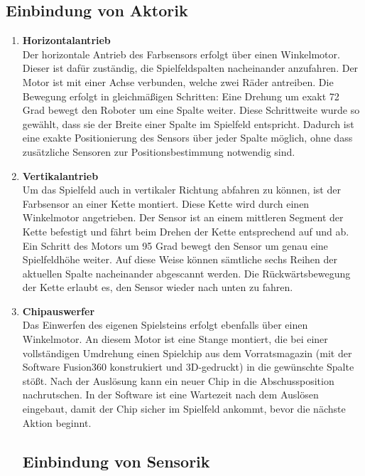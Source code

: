\subsection{Einbindung von Aktorik}
\begin{enumerate}
	\item \textbf{Horizontalantrieb}\\
	Der horizontale Antrieb des Farbsensors erfolgt über einen Winkelmotor. Dieser ist dafür zuständig, die Spielfeldspalten nacheinander anzufahren. Der Motor ist mit einer Achse verbunden, welche zwei Räder antreiben. Die Bewegung erfolgt in gleichmäßigen Schritten: Eine Drehung um exakt 72 Grad bewegt den Roboter um eine Spalte weiter. Diese Schrittweite wurde so gewählt, dass sie der Breite einer Spalte im Spielfeld entspricht. Dadurch ist eine exakte Positionierung des Sensors über jeder Spalte möglich, ohne dass zusätzliche Sensoren zur Positionsbestimmung notwendig sind. 
	\item \textbf{Vertikalantrieb}\\
	 Um das Spielfeld auch in vertikaler Richtung abfahren zu können, ist der Farbsensor an einer Kette montiert. Diese Kette wird durch einen Winkelmotor angetrieben. Der Sensor ist an einem mittleren Segment der Kette befestigt und fährt beim Drehen der Kette entsprechend auf und ab. Ein Schritt des Motors um 95 Grad bewegt den Sensor um genau eine Spielfeldhöhe weiter. Auf diese Weise können sämtliche sechs Reihen der aktuellen Spalte nacheinander abgescannt werden. Die Rückwärtsbewegung der Kette erlaubt es, den Sensor wieder nach unten zu fahren.
	\item \textbf{Chipauswerfer}\\
	Das Einwerfen des eigenen Spielsteins erfolgt ebenfalls über einen Winkelmotor. An diesem Motor ist eine Stange montiert, die bei einer vollständigen Umdrehung einen Spielchip aus dem Vorratsmagazin (mit der Software Fusion360 konstrukiert und 3D-gedruckt) in die gewünschte Spalte stößt. Nach der Auslösung kann ein neuer Chip in die Abschussposition nachrutschen. In der Software ist eine Wartezeit nach dem Auslösen eingebaut, damit der Chip sicher im Spielfeld ankommt, bevor die nächste Aktion beginnt.


\subsection{Einbindung von Sensorik}


\end{enumerate}
